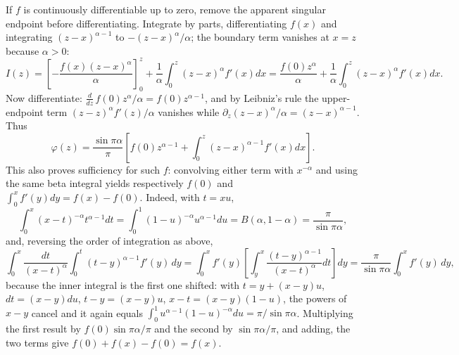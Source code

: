 If $f$ is continuously differentiable up to zero, remove the apparent
singular endpoint before differentiating. Integrate by parts,
differentiating $f(x)$ and integrating $(z-x)^{\alpha-1}$ to
$-(z-x)^\alpha/\alpha$; the boundary term vanishes at $x=z$ because
$\alpha>0$:
\[
I(z)=\left[-\frac{f(x)(z-x)^\alpha}{\alpha}\right]_0^z
+\frac1\alpha\int_0^z(z-x)^\alpha f'(x)dx
=\frac{f(0)z^\alpha}{\alpha}
+\frac1\alpha\int_0^z(z-x)^\alpha f'(x)dx.
\]
Now differentiate: $\frac{d}{dz}\,f(0)z^\alpha/\alpha=f(0)z^{\alpha-1}$,
and by Leibniz's rule the upper-endpoint term
$(z-z)^\alpha f'(z)/\alpha$ vanishes while
$\partial_z(z-x)^\alpha/\alpha=(z-x)^{\alpha-1}$. Thus
\[
\boxed{\varphi(z)=\frac{\sin\pi\alpha}{\pi}
\left[f(0)z^{\alpha-1}+
\int_0^z(z-x)^{\alpha-1}f'(x)dx\right]}.
\]
This also proves sufficiency for such $f$: convolving either term with
$x^{-\alpha}$ and using the same beta integral yields respectively
$f(0)$ and $\int_0^x f'(y)dy=f(x)-f(0)$. Indeed, with $t=xu$,
\[
\int_0^x(x-t)^{-\alpha}t^{\alpha-1}dt=\int_0^1(1-u)^{-\alpha}u^{\alpha-1}du
=B(\alpha,1-\alpha)=\frac{\pi}{\sin\pi\alpha},
\]
and, reversing the order of integration as above,
\[
\int_0^x\frac{dt}{(x-t)^\alpha}\int_0^t(t-y)^{\alpha-1}f'(y)\,dy
=\int_0^xf'(y)\left[\int_y^x\frac{(t-y)^{\alpha-1}}{(x-t)^\alpha}dt\right]dy
=\frac{\pi}{\sin\pi\alpha}\int_0^xf'(y)\,dy,
\]
because the inner integral is the first one shifted: with
$t=y+(x-y)u$, $dt=(x-y)du$, $t-y=(x-y)u$, $x-t=(x-y)(1-u)$, the powers
of $x-y$ cancel and it again equals
$\int_0^1u^{\alpha-1}(1-u)^{-\alpha}du=\pi/\sin\pi\alpha$.
Multiplying the first result by $f(0)\sin\pi\alpha/\pi$ and the second
by $\sin\pi\alpha/\pi$, and adding, the two terms give
$f(0)+f(x)-f(0)=f(x)$.


